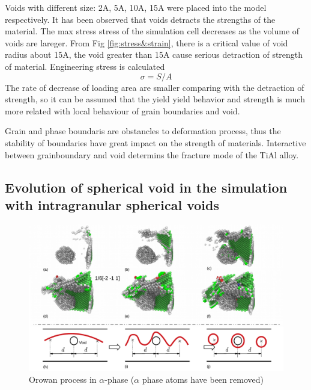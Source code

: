 \documentclass[metals,article,submit,moreauthors,pdftex,10pt,a4paper]{Definitions/mdpi}
\begin{document}
	
Voids with different size: 2A, 5A, 10A, 15A were placed into the model respectively. It has been observed that voids detracts the strengths of the material. The max stress stress of the simulation cell decreases as the volume of voids are lareger. From Fig \ref{fig:stress&strain}, there is a critical value of void radius about 15A, the void greater than 15A cause serious detraction of strength of material. 
Engineering stress is calculated
	$$ \sigma = S/A$$
The rate of decrease of loading area are smaller comparing with the detraction of strength, so it can be assumed that the yield yield behavior and strength is much more related with local behaviour of grain boundaries and void.
	
Grain and phase boundaris are obstancles to deformation process, thus the stability of boundaries have great impact on the strength of materials. Interactive between grainboundary and void determins the fracture mode of the TiAl alloy.

\subsection{Evolution of spherical void in the simulation with intragranular spherical voids}

\begin{figure}[ht]
	\centering
	\includegraphics[width=1\linewidth]{"img/dis-void2"}
	\caption{Orowan process in $\alpha$-phase ($\alpha$ phase atoms have been removed)}
	\label{fig:orowan}
\end{figure}
\end{document}
